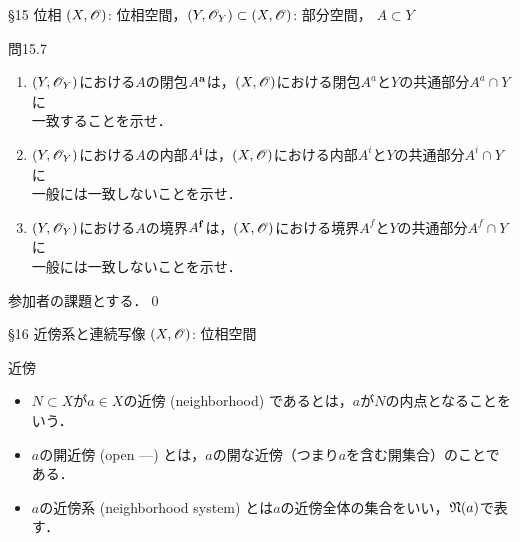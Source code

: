 \documentclass[uplatex,a4paper,dvipdfmx,aspectratio=169,11pt]{beamer}
\begin{document}
\begin{frame}[fragile]{\S 15 位相}
    $(X, \mathscr{O})$: 位相空間，$(Y, \mathscr{O}_Y) \subset (X, \mathscr{O})$: 部分空間， \quad $A \subset Y$

    \begin{exampleblock}{問15.7}
        \begin{enumerate}
            \item $(Y, \mathscr{O}_Y)$における$A$の閉包$A^{\vb a}$は，$(X, \mathscr{O})$における閉包$A^a$と$Y$の共通部分$A^a \cap Y$に\\一致することを示せ．
            \item $(Y, \mathscr{O}_Y)$における$A$の内部$A^{\vb i}$は，$(X, \mathscr{O})$における内部$A^i$と$Y$の共通部分$A^i \cap Y$に\\一般には一致しないことを示せ．
            \item $(Y, \mathscr{O}_Y)$における$A$の境界$A^{\vb f}$は，$(X, \mathscr{O})$における境界$A^f$と$Y$の共通部分$A^f \cap Y$に\\一般には一致しないことを示せ．
        \end{enumerate}
    \end{exampleblock}

    \medskip{}
    参加者の課題とする．\qed
\end{frame}

\begin{frame}[fragile]{\S 16 近傍系と連続写像}
    $(X, \mathscr{O})$: 位相空間

    \begin{block}{近傍}
        \begin{itemize}
            \item $N \subset X$が$a \in X$の\alert{近傍} (neighborhood) であるとは，$a$が$N$の内点となることをいう．
            \item $a$の\alert{開近傍} (open ---) とは，$a$の開な近傍（つまり$a$を含む開集合）のことである．
            \item $a$の\alert{近傍系} (neighborhood system) とは$a$の近傍全体の集合をいい，$\mathord{\mathfrak{N}}\qty(a)$で表す．
        \end{itemize}
    \end{block}

    \medskip{}
\end{frame}
\end{document}
